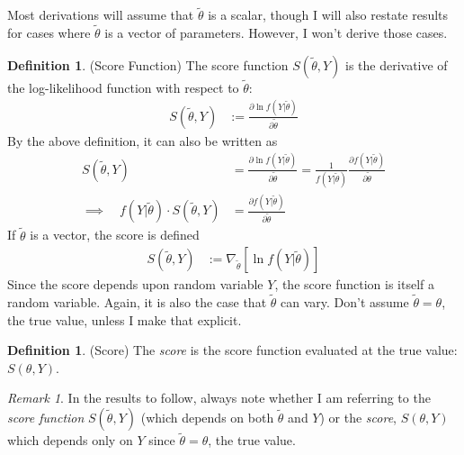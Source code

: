 \documentclass[12pt]{article}
\theoremstyle{plain}
\theoremstyle{definition}
\newtheorem{defn}[thm]{Definition}
\theoremstyle{remark}
\newtheorem*{rmk}{Remark}
\begin{document}
Most derivations will assume that $\tilde{\theta}$ is a scalar, though I
will also restate results for cases where $\tilde{\theta}$ is a vector
of parameters.  However, I won't derive those cases.

\begin{defn}(Score Function)
The score function $S(\tilde{\theta},Y)$ is the derivative of the
log-likelihood function with respect to $\tilde{\theta}$:
\begin{align}
  S(\tilde{\theta},Y) &:=
  \frac{\partial \ln f(Y|\tilde{\theta})}{\partial \tilde{\theta}}
  \label{score1}
\end{align}
By the above definition, it can also be written as
\begin{align}
  S(\tilde{\theta},Y)
  &= \frac{\partial \ln f(Y|\tilde{\theta})}{\partial \tilde{\theta}}
  = \frac{1}{f(Y|\tilde{\theta})} \frac{\partial f(Y|\tilde{\theta})}{\partial \tilde{\theta}}
  \label{score2} \\
  \implies\quad
  f(Y|\tilde{\theta}) \cdot S(\tilde{\theta},Y)
  &=
  \frac{\partial f(Y|\tilde{\theta})}{\partial \tilde{\theta}}
  \label{score3}
\end{align}
If $\tilde{\theta}$ is a vector, the score is defined
\begin{align*}
  S(\tilde{\theta},Y)
  &:= \nabla_{\tilde{\theta}} \left[\ln f(Y|\tilde{\theta})\right]
\end{align*}
Since the score depends upon random variable $Y$, the score function is
itself a random variable. Again, it is also the case that
$\tilde{\theta}$ can vary. Don't assume $\tilde{\theta}=\theta$, the
true value, unless I make that explicit.
\end{defn}

\begin{defn}(Score)
The \emph{score} is the score function evaluated at the true value:
$S(\theta,Y)$.
\end{defn}
\begin{rmk}
In the results to follow, always note whether I am referring to the
\emph{score function} $S(\tilde{\theta},Y)$ (which depends on both
$\tilde{\theta}$ and $Y$) or the \emph{score}, $S(\theta,Y)$ which
depends only on $Y$ since $\tilde{\theta}=\theta$, the true value.
\end{rmk}
\end{document}
